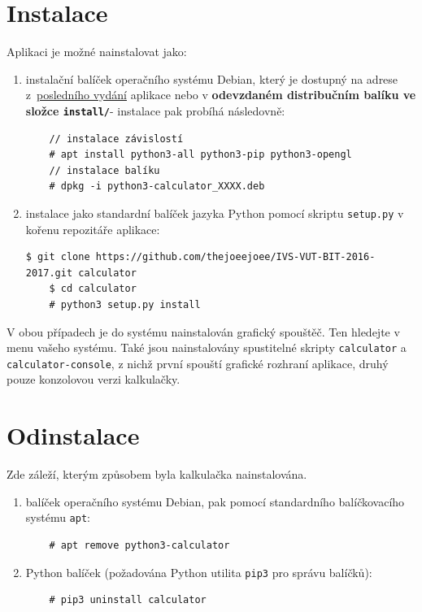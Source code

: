 \documentclass[a4paper, 11pt]{article}
\begin{document}
\section{Instalace}
Aplikaci je možné nainstalovat jako:
\begin{enumerate}
    \item instalační balíček operačního systému Debian, který je dostupný na adrese z~\href{https://github.com/thejoeejoee/IVS-VUT-BIT-2016-2017/releases/latest}{posledního vydání} aplikace nebo v \textbf{odevzdaném distribučním balíku ve složce \texttt{install/}}- instalace pak probíhá následovně: \\
    \begin{lstlisting}
    // instalace závislostí
    # apt install python3-all python3-pip python3-opengl
    // instalace balíku
    # dpkg -i python3-calculator_XXXX.deb
    \end{lstlisting}
    \item instalace jako standardní balíček jazyka Python pomocí skriptu \texttt{setup.py} v kořenu repozitáře aplikace:
    \begin{lstlisting}[breaklines]
    $ git clone https://github.com/thejoeejoee/IVS-VUT-BIT-2016-2017.git calculator
    $ cd calculator
    # python3 setup.py install
    \end{lstlisting}
\end{enumerate}

V obou případech je do systému nainstalován grafický spouštěč. Ten hledejte
v menu vašeho systému. Také jsou nainstalovány spustitelné skripty
\texttt{calculator}     a \texttt{calculator-console}, z nichž první spouští
grafické rozhraní aplikace, druhý pouze konzolovou verzi kalkulačky.

\section{Odinstalace}

Zde záleží, kterým způsobem byla kalkulačka nainstalována.
\begin{enumerate}
    \item balíček operačního systému Debian, pak pomocí standardního balíčkovacího systému \texttt{apt}:
    \begin{lstlisting}
    # apt remove python3-calculator
    \end{lstlisting}
    \item Python balíček (požadována Python utilita \texttt{pip3} pro správu balíčků):
    \begin{lstlisting}
    # pip3 uninstall calculator
    \end{lstlisting}
\end{enumerate}
\end{document}
